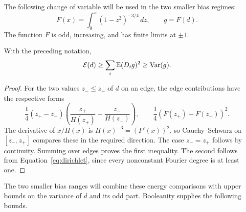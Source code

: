 The following change of variable will be used in the two smaller bias regimes:
\begin{equation}\label{eq:F-definition}
F(x)=\int_0^x(1-z^2)^{-3/4}\,dz,\qquad g=F(d).
\end{equation}
The function \(F\) is odd, increasing, and has finite limits at \(\pm1\).

\begin{lemma}\label{lem:basic-energy}
With the preceding notation,
\begin{equation}\label{eq:basic-energy}
\mathcal E(d)\ge\sum_i\mathbb E(D_i g)^2\ge\operatorname{Var}(g).
\end{equation}
\end{lemma}
\begin{proof}
For the two values \(z_-\le z_+\) of \(d\) on an edge, the edge contributions have the respective forms
\[
\frac14(z_+-z_-)\left(\frac{z_+}{H(z_+)}-\frac{z_-}{H(z_-)}\right),
\qquad
\frac14(F(z_+)-F(z_-))^2.
\]
The derivative of \(x/H(x)\) is \(H(x)^{-3}=(F'(x))^2\), so Cauchy--Schwarz on \([z_-,z_+]\) compares these in the required direction. The case \(z_-=z_+\) follows by continuity. Summing over edges proves the first inequality.
The second follows from Equation~\eqref{eq:dirichlet}, since every nonconstant Fourier degree is at least one.
\end{proof}

The two smaller bias ranges will combine these energy comparisons with
upper bounds on the variance of $d$ and its odd part.  Booleanity supplies
the following bounds.

